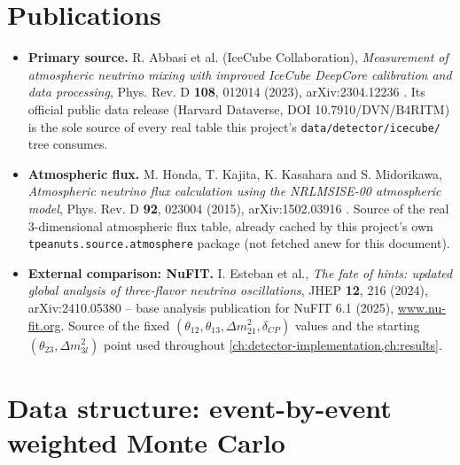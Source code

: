 \label{ch:data-release}

\section{Publications}

\begin{refbox}
\begin{itemize}
  \item \textbf{Primary source.} R. Abbasi et al. (IceCube Collaboration),
    \emph{Measurement of atmospheric neutrino mixing with improved IceCube
    DeepCore calibration and data processing}, Phys. Rev. D \textbf{108},
    012014 (2023), arXiv:2304.12236 \parencite{Abbasi2023IceCube}. Its
    official public data release (Harvard Dataverse, DOI
    10.7910/DVN/B4RITM) is the sole source of every real table this
    project's \texttt{data/detector/icecube/} tree consumes.
  \item \textbf{Atmospheric flux.} M. Honda, T. Kajita, K. Kasahara and S.
    Midorikawa, \emph{Atmospheric neutrino flux calculation using the
    NRLMSISE-00 atmospheric model}, Phys. Rev. D \textbf{92}, 023004
    (2015), arXiv:1502.03916 \parencite{Honda2015Flux}. Source of the real
    3-dimensional atmospheric flux table, already cached by this project's
    own \texttt{tpeanuts.source.atmosphere} package (not fetched anew for
    this document).
  \item \textbf{External comparison: NuFIT.} I. Esteban et al., \emph{The
    fate of hints: updated global analysis of three-flavor neutrino
    oscillations}, JHEP \textbf{12}, 216 (2024), arXiv:2410.05380
    \parencite{EstebanNuFit2024} -- base analysis publication for NuFIT 6.1
    (2025), \url{www.nu-fit.org}. Source of the fixed
    $(\theta_{12},\theta_{13},\Delta m^2_{21},\delta_{CP})$ values and the
    starting $(\theta_{23},\Delta m^2_{3l})$ point used throughout
    \cref{ch:detector-implementation,ch:results}.
\end{itemize}
\end{refbox}

\section{Data structure: event-by-event weighted Monte Carlo}
\label{sec:data-structure}

